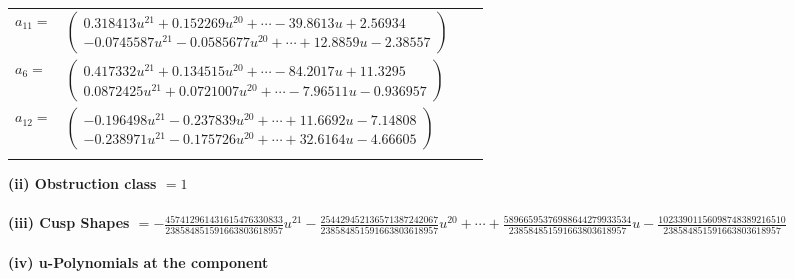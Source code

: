 \documentclass[1p]{elsarticle_modified}
\theoremstyle{definition}
\begin{document}
\begin{tabular}{m{7pt} m{180pt} m{7pt} m{180pt} }
\flushright $a_{11}=$&$\begin{pmatrix}0.318413 u^{21}+0.152269 u^{20}+\cdots-39.8613 u+2.56934\\-0.0745587 u^{21}-0.0585677 u^{20}+\cdots+12.8859 u-2.38557\end{pmatrix}$ \\
\flushright $a_{6}=$&$\begin{pmatrix}0.417332 u^{21}+0.134515 u^{20}+\cdots-84.2017 u+11.3295\\0.0872425 u^{21}+0.0721007 u^{20}+\cdots-7.96511 u-0.936957\end{pmatrix}$ \\
\flushright $a_{12}=$&$\begin{pmatrix}-0.196498 u^{21}-0.237839 u^{20}+\cdots+11.6692 u-7.14808\\-0.238971 u^{21}-0.175726 u^{20}+\cdots+32.6164 u-4.66605\end{pmatrix}$\\&\end{tabular}
\flushleft \textbf{(ii) Obstruction class $= 1$}\\~\\
\flushleft \textbf{(iii) Cusp Shapes $= -\frac{457412961431615476330833}{238584851591663803618957} u^{21}-\frac{254429452136571387242067}{238584851591663803618957} u^{20}+\cdots+\frac{58966595376988644279933534}{238584851591663803618957} u-\frac{10233901156098748389216510}{238584851591663803618957}$}\\~\\
\newpage\renewcommand{\arraystretch}{1}
\flushleft \textbf{(iv) u-Polynomials at the component}\newline \\
\end{document}
